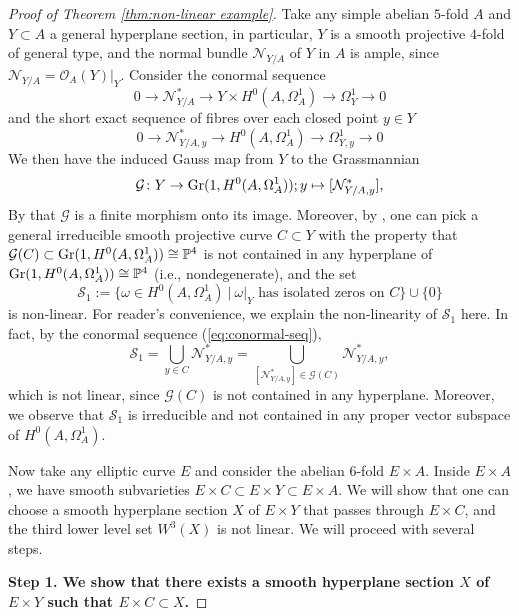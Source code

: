 \documentclass[a4paper,12pt,reqno]{amsart}
\theoremstyle{question}
\theoremstyle{definition}
\theoremstyle{remark}
\theoremstyle{cited}
\theoremstyle{citeddef}
\def\PP{{\mathbb P}}
\def\cO{\mathcal{O}}
\def\cG{\mathcal{G}}
\def\cS{\mathcal{S}}
\def\cN{\mathcal{N}}
\begin{document}
\begin{proof}[Proof of Theorem \ref{thm:non-linear example}]
Take any simple abelian $5$-fold $A$ and $Y\subset A$ a general hyperplane section, in particular, $Y$ is a smooth projective $4$-fold of general type, and the normal bundle $\cN_{Y/A}$ of $Y$ in $A$ is ample, since $\cN_{Y/A}=\cO_{A}(Y)|_{Y}$. Consider the conormal sequence \[0\to \cN^*_{Y/A}\to Y\times H^0(A, \Omega_A^1)\to \Omega_Y^1\to 0\] and the short exact sequence of fibres over each closed point $y\in Y$ 
\begin{equation}\label{eq:conormal-seq}
  0\to \cN^*_{Y/A, y}\to H^0(A, \Omega_A^1)\to \Omega^1_{Y,y}\to 0  
\end{equation}
 We then have the induced Gauss map  from $Y$ to the Grassmannian \[
 \cG\colon Y\to \textnormal{Gr}(1,H^0(A,\Omega_A^1)); y\mapsto [\cN^*_{Y/A, y}],
 \]
By \cite[Corollary~2]{Ran84} that $\cG$ is a finite morphism onto its image. Moreover, by \cite[Theorem]{WZ25}, one can pick a general irreducible smooth projective  curve $C\subset Y$ with the property that $\cG(C)\subset \textnormal{Gr}(1,H^0(A,\Omega_A^1))\cong \PP^4$ is not contained in any hyperplane of $\textnormal{Gr}(1,H^0(A,\Omega_A^1))\cong \PP^4$ (i.e., nondegenerate), and the set \[\cS_1:=\{\omega\in H^0(A,\Omega_A^1)\ |\ \omega|_Y \text{ has isolated zeros on }C\}\cup\{0\}\] is non-linear. For reader's convenience, we explain the non-linearity of $\cS_1$ here. In fact, by the conormal sequence (\ref{eq:conormal-seq}), $$\cS_1=\bigcup_{y\in C}\cN^*_{Y/A, y}=\bigcup_{[\cN^*_{Y/A, y}]\in \mathcal{G}(C)}\cN^*_{Y/A, y},$$ which is not linear, since $\mathcal{G}(C)$ is not contained in any hyperplane. Moreover, we observe that $\cS_1$ is irreducible and not contained in any proper vector subspace of $H^0(A,\Omega_A^1)$.


Now take any elliptic curve $E$ and consider the abelian 6-fold $E\times A$. Inside $E\times A$, we have smooth subvarieties $E\times C\subset E\times Y\subset E\times A.$ We will show that one can choose a smooth hyperplane section $X$ of $E\times Y$ that passes through $E\times C$, and the third lower level set $W^3(X)$ is not linear. We will proceed with several steps.

\textbf{Step 1. We show that there exists a smooth hyperplane section $X$ of $E\times Y$ such that $E\times C\subset X$.}


\end{proof}
\end{document}
